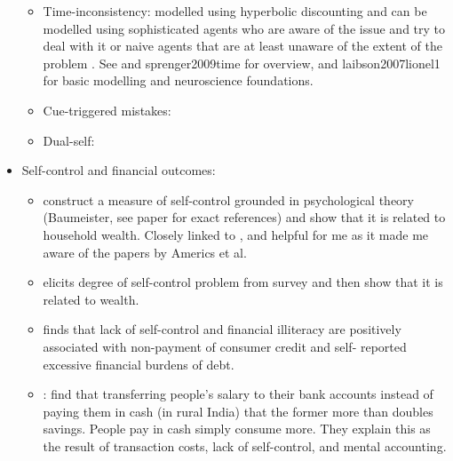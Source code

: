 \documentclass[a4paper, 11pt]{report}
\begin{document}
\begin{itemize}
\begin{itemize}
		\item Time-inconsistency: modelled using hyperbolic discounting \citep{ainslie1975specious} and can be modelled using sophisticated agents who are aware of the issue and try to deal with it \citep{laibson1997golden} or naive agents that are at least unaware of the extent of the problem \citep{o1999doing, o2001choice}. See \citet{frederick2002time} and sprenger2009time  for overview, and laibson2007lionel1 for basic modelling and neuroscience foundations.

		\item Cue-triggered mistakes: \citep{bernheim2004addiction}

		\item Dual-self: \citet{thaler1981economic,benhabib2005modeling,fudenberg2006dual,loewenstein2004animal}
	\end{itemize}

	\item Self-control and financial outcomes:
	\begin{itemize}
		\item \citet{biljanovska2018control} construct a measure of self-control grounded in psychological theory (Baumeister, see paper for exact references) and show that it is related to household wealth. Closely linked to \citet{gathergood2012self}, and helpful for me as it made me aware of the papers by Americs et al.

		\item \citep{ameriks2007measuring} elicits degree of self-control problem from survey and then show that it is related to wealth.

		\item \citet{gathergood2012self} finds that lack of self-control and financial illiteracy are positively associated with non-payment of consumer credit and self- reported excessive financial burdens of debt.

		\item \citet{somville2018saving}: find that transferring people's salary to their bank accounts instead of paying them in cash (in rural India) that the former more than doubles savings. People pay in cash simply consume more. They explain this as the result of transaction costs, lack of self-control, and mental accounting.
	\end{itemize}


\end{itemize}
\end{document}
